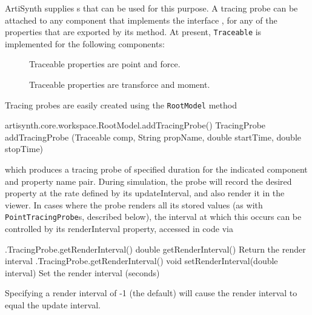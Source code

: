 ArtiSynth supplies s that can be used for this
purpose.  A tracing probe can be attached to any component that implements the
interface
, for any of the properties that
are exported by its 
 method.
At present, {\tt Traceable} is implemented for the following components:

\begin{description}

\item[]\mbox{}

Traceable properties are {\sf point} and {\sf force}.

\item[]\mbox{}

Traceable properties are {\sf transforce} and {\sf moment}.

\end{description}


Tracing probes are easily created using the {\tt RootModel} method
%
\begin{methodtable}{0.95}{0.05}
%
\methodentry
{artisynth.core.workspace.RootModel.addTracingProbe()}%
{TracingProbe addTracingProbe (Traceable comp, String propName,
double startTime, double stopTime)}%
{\ }%
%
\end{methodtable}
%
which produces a tracing probe of specified duration for the indicated
component and property name pair. During simulation, the probe will record the
desired property at the rate defined by its {\sf updateInterval}, and also
render it in the viewer. In cases where the probe renders all its stored values
(as with {\tt PointTracingProbe}s, described below), the interval at which this
occurs can be controlled by its {\sf renderInterval} property, accessed
in code via
%
\begin{methodtable}{0.5}{0.5}
%
\methodentry
{\probes.TracingProbe.getRenderInterval()}%
{double getRenderInterval()}%
{Return the render interval}%
%
\methodentry
{\probes.TracingProbe.getRenderInterval()}%
{void setRenderInterval(double interval)}%
{Set the render interval (seconds)}%
%
\end{methodtable}
%
Specifying a render interval of -1 (the default) will cause
the render interval to equal the update interval.

